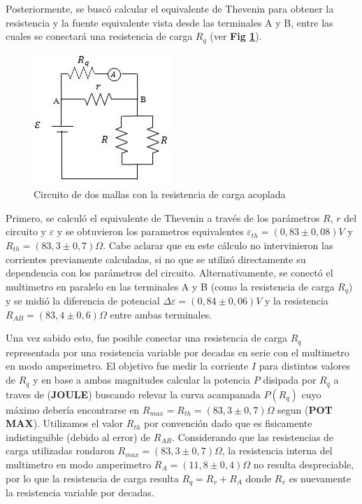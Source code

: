\documentclass[11pt,a4paper]{article}
\begin{document}
Posteriormente, se buscó calcular el equivalente de Thevenin para obtener la resistencia y la fuente equivalente vista desde las terminales A y B, entre las cuales se conectará una resistencia de carga $R_q$ (ver \textbf{Fig \ref{fig:circ_mallas_carga}}). 

\begin{figure}[h]
  \centering
  \includegraphics[scale=1]{Mallas_con_carga}
  \caption{Circuito de dos mallas con la resistencia de carga acoplada}
  \label{fig:circ_mallas_carga}
\end{figure}

Primero, se calculó el equivalente de Thevenin a través de los parámetros $R$, $r$ del circuito y $\varepsilon$ y se obtuvieron los parametros equivalentes $\varepsilon_{th} = (0,83\pm0,08)V$ y $R_{th} = (83,3 \pm 0,7) \Omega$. Cabe aclarar que en este cálculo no intervinieron las corrientes previamente calculadas, si no que se utilizó directamente su dependencia con los parámetros del circuito. Alternativamente, se conectó el multimetro en paralelo en las terminales A y B (como la resistencia de carga $R_q$) y se midió la diferencia de potencial $\Delta\varepsilon = (0,84 \pm 0,06)V$ y la resistencia $R_{AB} = (83,4\pm0,6)\Omega$ entre ambas terminales. 

Una vez sabido esto, fue posible conectar una resistencia de carga $R_q$ representada por una resistencia variable por decadas en serie con el multimetro en modo amperimetro. El objetivo fue medir la corriente $I$ para distintos valores de $R_q$ y en base a ambas magnitudes calcular la potencia $P$ disipada por $R_q$ a traves de (\textbf{JOULE}) buscando relevar la curva acampanada $P(R_q)$ cuyo máximo debería encontrarse en $R_{max} = R_{th} = (83,3\pm0,7)\Omega$ segun (\textbf{POT MAX}). Utilizamos el valor $R_{th}$ por convención dado que es fisicamente indistinguible (debido al error) de $R_{AB}$. Considerando que las resistencias de carga utilizadas rondaron $R_{max} = (83,3\pm0,7)\Omega$, la resistencia interna del multimetro en modo amperimetro $R_{A} = (11,8 \pm 0,4) \Omega$ no resulta despreciable, por lo que la resistencia de carga resulta $R_q = R_v + R_A$ donde $R_v$ es nuevamente la resistencia variable por decadas. 
\end{document}
